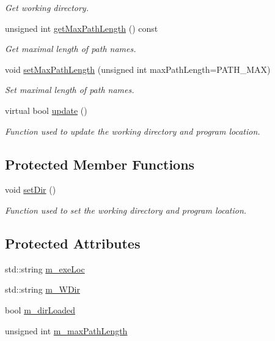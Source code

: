 \begin{DoxyCompactItemize}
\begin{DoxyCompactList}\small\item\em \-Get working directory. \end{DoxyCompactList}\item 
unsigned int \hyperlink{classdwf__utils_1_1dir_parser_a12e65b65ea478894db62237ca234dfca}{get\-Max\-Path\-Length} () const 
\begin{DoxyCompactList}\small\item\em \-Get maximal length of path names. \end{DoxyCompactList}\item 
void \hyperlink{classdwf__utils_1_1dir_parser_af5fe8320cc384ea9f53d954d1eb0f293}{set\-Max\-Path\-Length} (unsigned int max\-Path\-Length=\-P\-A\-T\-H\-\_\-\-M\-A\-X)
\begin{DoxyCompactList}\small\item\em \-Set maximal length of path names. \end{DoxyCompactList}\item 
virtual bool \hyperlink{classdwf__utils_1_1dir_parser_abb7d71b7a71833007b51cf3131619ec5}{update} ()
\begin{DoxyCompactList}\small\item\em \-Function used to update the working directory and program location. \end{DoxyCompactList}\end{DoxyCompactItemize}
\subsection*{\-Protected \-Member \-Functions}
\begin{DoxyCompactItemize}
\item 
void \hyperlink{classdwf__utils_1_1dir_parser_aaa509c8f4bea9809212bcd3ffc656a86}{set\-Dir} ()
\begin{DoxyCompactList}\small\item\em \-Function used to set the working directory and program location. \end{DoxyCompactList}\end{DoxyCompactItemize}
\subsection*{\-Protected \-Attributes}
\begin{DoxyCompactItemize}
\item 
std\-::string \hyperlink{classdwf__utils_1_1dir_parser_a3143c04d12fbb30e1d23e599eaae4a26}{m\-\_\-exe\-Loc}
\item 
std\-::string \hyperlink{classdwf__utils_1_1dir_parser_a82f8c1645951c9618306e182145564d8}{m\-\_\-\-W\-Dir}
\item 
bool \hyperlink{classdwf__utils_1_1dir_parser_ae401a84a2c08933ab79b1238ead0d50e}{m\-\_\-dir\-Loaded}
\item 
unsigned int \hyperlink{classdwf__utils_1_1dir_parser_a943ff3e8c7a9bc09c9a92c4c4fe983c7}{m\-\_\-max\-Path\-Length}
\end{DoxyCompactItemize}


